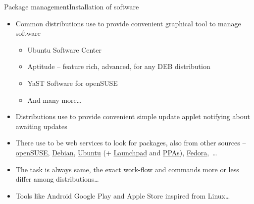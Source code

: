 \documentclass[compress, ucs, xelatex, 11pt, xcolor=svgnames,
  hyperref={
    bookmarks=true,
    unicode=true,
    colorlinks=true,
    pdftitle={Linux, command line and MetaCentrum},
    plainpages=false,
    pdfauthor={Vojtech Zeisek},
    pdfsubject={Course about use of Linux command line, writing shell scripts and using MetaCentrum of CESNET},
    pdfcreator={XeLaTeX},
    pdfkeywords={Linux, GNU, BASH, shell, command line, MetaCentrum},
    linkcolor=DarkRed,
    anchorcolor=DarkBlue,
    citecolor=Indigo,
    filecolor=NavyBlue,
    menucolor=DarkMagenta,
    urlcolor=DarkBlue,
    pdftex},
  url={hyphens, lowtilde} %
  ]{beamer}
\begin{document}
\begin{frame}[allowframebreaks]{Package management}{Installation of software}
\begin{itemize}
    \item Common distributions use to provide convenient graphical tool to manage software
    \begin{itemize}
      \item Ubuntu Software Center
      \item Aptitude -- feature rich, advanced, for any DEB distribution
      \item YaST Software for openSUSE
      \item And many more\ldots
    \end{itemize}
    \item Distributions use to provide convenient simple update applet notifying about awaiting updates
    \item There use to be web services to look for packages, also from other sources -- \href{https://software.opensuse.org/}{openSUSE}, \href{https://www.debian.org/distrib/packages\#search_packages}{Debian}, \href{http://packages.ubuntu.com/}{Ubuntu} (+ \href{https://launchpad.net/ubuntu/+search}{Launchpad} and \href{https://launchpad.net/ubuntu/+ppas}{PPAs}), \href{https://admin.fedoraproject.org/pkgdb/}{Fedora},~\ldots
    \item The task is always same, the exact work-flow and commands more or less differ among distributions\ldots
    \item Tools like Android Google Play and Apple Store inspired from Linux\ldots
  \end{itemize}
\end{frame}
\end{document}
